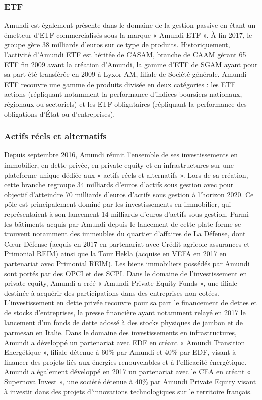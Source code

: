 \subsubsection{ETF}
\par Amundi est également présente dans le domaine de la gestion passive en étant un émetteur d'ETF commercialisés sous la marque « Amundi ETF ». À fin 2017, le groupe gère 38 milliards d'euros sur ce type de produits. Historiquement, l'activité d'Amundi ETF est héritée de CASAM, branche de CAAM gérant 65 ETF fin 2009 avant la création d'Amundi, la gamme d'ETF de SGAM ayant pour sa part été transférée en 2009 à Lyxor AM, filiale de Société générale. Amundi ETF recouvre une gamme de produits divisée en deux catégories : les ETF actions (répliquant notamment la performance d'indices boursiers nationaux, régionaux ou sectoriels) et les ETF obligataires (répliquant la performance des obligations d'État ou d'entreprises).

\subsubsection{Actifs réels et alternatifs}
\par Depuis septembre 2016, Amundi réunit l'ensemble de ses investissements en immobilier, en dette privée, en private equity et en infrastructures sur une plateforme unique dédiée aux « actifs réels et alternatifs ». Lors de sa création, cette branche regroupe 34 milliards d'euros d'actifs sous gestion avec pour objectif d'atteindre 70 milliards d'euros d'actifs sous gestion à l'horizon 2020. Ce pôle est principalement dominé par les investissements en immobilier, qui représentaient à son lancement 14 milliards d'euros d'actifs sous gestion. Parmi les bâtiments acquis par Amundi depuis le lancement de cette plate-forme se trouvent notamment des immeubles du quartier d'affaires de La Défense, dont Cœur Défense (acquis en 2017 en partenariat avec Crédit agricole assurances et Primonial REIM) ainsi que la Tour Hekla (acquise en VEFA en 2017 en partenariat avec Primonial REIM). Les biens immobiliers possédés par Amundi sont portés par des OPCI et des SCPI. Dans le domaine de l'investissement en private equity, Amundi a créé « Amundi Private Equity Funds », une filiale destinée à acquérir des participations dans des entreprises non cotées. L'investissement en dette privée recouvre pour sa part le financement de dettes et de stocks d'entreprises, la presse financière ayant notamment relayé en 2017 le lancement d'un fonds de dette adossé à des stocks physiques de jambon et de parmesan en Italie. Dans le domaine des investissements en infrastructures, Amundi a développé un partenariat avec EDF en créant « Amundi Transition Energétique », filiale détenue à 60\% par Amundi et 40\% par EDF, visant à financer des projets liés aux énergies renouvelables et à l'efficacité énergétique. Amundi a également développé en 2017 un partenariat avec le CEA en créant « Supernova Invest », une société détenue à 40\% par Amundi Private Equity visant à investir dans des projets d'innovations technologiques sur le territoire français.

